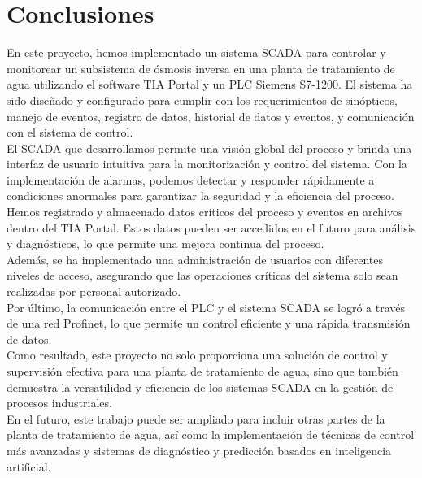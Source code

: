 \chapter*{Conclusiones}

En este proyecto, hemos implementado un sistema SCADA para controlar y monitorear un subsistema de ósmosis inversa en una planta de tratamiento de agua utilizando el software TIA Portal y un PLC Siemens S7-1200. El sistema ha sido diseñado y configurado para cumplir con los requerimientos de sinópticos, manejo de eventos, registro de datos, historial de datos y eventos, y comunicación con el sistema de control.\\

El SCADA que desarrollamos permite una visión global del proceso y brinda una interfaz de usuario intuitiva para la monitorización y control del sistema. Con la implementación de alarmas, podemos detectar y responder rápidamente a condiciones anormales para garantizar la seguridad y la eficiencia del proceso.\\

Hemos registrado y almacenado datos críticos del proceso y eventos en archivos dentro del TIA Portal. Estos datos pueden ser accedidos en el futuro para análisis y diagnósticos, lo que permite una mejora continua del proceso.\\

Además, se ha implementado una administración de usuarios con diferentes niveles de acceso, asegurando que las operaciones críticas del sistema solo sean realizadas por personal autorizado.\\

Por último, la comunicación entre el PLC y el sistema SCADA se logró a través de una red Profinet, lo que permite un control eficiente y una rápida transmisión de datos.\\

Como resultado, este proyecto no solo proporciona una solución de control y supervisión efectiva para una planta de tratamiento de agua, sino que también demuestra la versatilidad y eficiencia de los sistemas SCADA en la gestión de procesos industriales.\\

En el futuro, este trabajo puede ser ampliado para incluir otras partes de la planta de tratamiento de agua, así como la implementación de técnicas de control más avanzadas y sistemas de diagnóstico y predicción basados en inteligencia artificial.